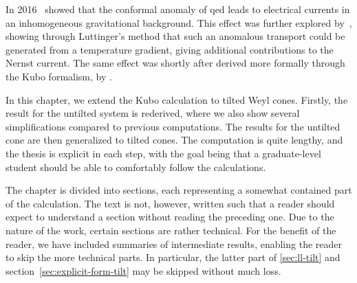In 2016~\textcite{chernodubAnomalousTransportDue2016} showed that the conformal anomaly of \gls{qed} leads to electrical currents in an inhomogeneous gravitational background.
This effect was further explored by~\textcite{chernodubGenerationNernstCurrent2018}, showing through Luttinger's method that such an anomalous transport could be generated from a temperature gradient, giving additional contributions to the Nernst current.
The same effect was shortly after derived more formally through the Kubo formalism, by \textcite{arjonaFingerprintsConformalAnomaly2019}.

In this chapter, we extend the Kubo calculation to tilted Weyl cones.
Firstly, the result for the untilted system is rederived, where we also show several simplifications compared to previous computations.
The results for the untilted cone are then generalized to tilted cones.
The computation is quite lengthy, and the thesis is explicit in each step, with the goal being that a graduate-level student should be able to comfortably follow the calculations.

The chapter is divided into sections, each representing a somewhat contained part of the calculation.
The text is not, however, written such that a reader should expect to understand a section without reading the preceding one.
Due to the nature of the work, certain sections are rather technical.
For the benefit of the reader, we have included summaries of intermediate results, enabling the reader to skip the more technical parts.
In particular, the latter part of \cref{sec:ll-tilt} and section~\ref{sec:explicit-form-tilt} may be skipped without much loss.

